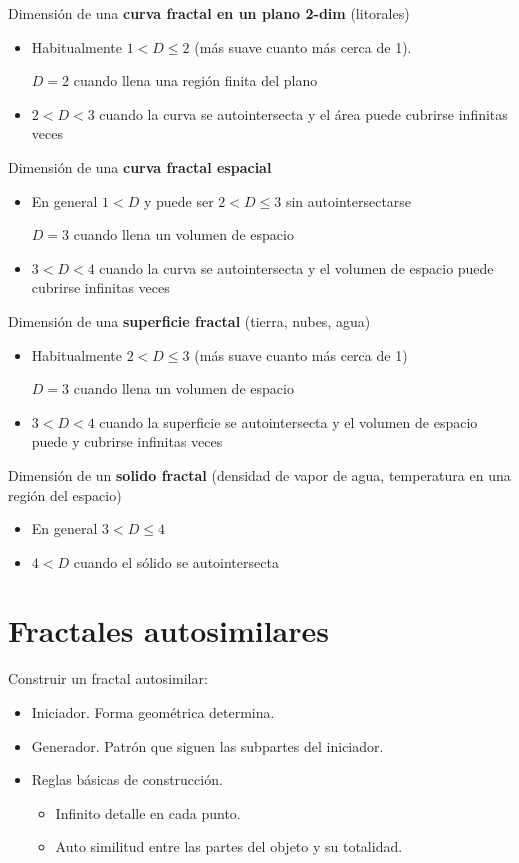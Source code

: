 Dimensión de una \textbf{curva fractal en un plano 2-dim} (litorales)
\begin{itemize}
    \item Habitualmente $1<D \leq 2$ (más suave cuanto más cerca de 1). 
    
    $D = 2$ cuando llena una región finita del plano
    \item $2<D<3$ cuando la curva se autointersecta y el área puede cubrirse infinitas veces
\end{itemize}

Dimensión de una \textbf{curva fractal espacial}
\begin{itemize}
    \item En general $1 < D$ y puede ser $2 < D \leq 3$ sin autointersectarse
    
    $D = 3$ cuando llena un volumen de espacio
    \item $3 < D < 4$ cuando la curva se autointersecta y el volumen de espacio puede cubrirse
    infinitas veces
\end{itemize}

Dimensión de una \textbf{superficie fractal} (tierra, nubes, agua)
\begin{itemize}
    \item Habitualmente $2 < D \leq 3$ (más suave cuanto más cerca de 1)
    
    $D = 3$ cuando llena un volumen de espacio
    \item $3 < D < 4$ cuando la superficie se autointersecta y el volumen de espacio puede y cubrirse infinitas veces
\end{itemize}

Dimensión de un \textbf{solido fractal} (densidad de vapor de agua, temperatura en
una región del espacio)
\begin{itemize}
    \item En general $3 < D \leq 4$
    \item $4 < D$ cuando el sólido se autointersecta
\end{itemize}

\section{Fractales autosimilares}
Construir un fractal autosimilar:
\begin{itemize}
    \item Iniciador. Forma geométrica determina.
    \item Generador. Patrón que siguen las subpartes del iniciador.
    \item Reglas básicas de construcción.
    \begin{itemize}
        \item Infinito detalle en cada punto.
        \item Auto similitud entre las partes del objeto y su totalidad.
    \end{itemize}
\end{itemize}

